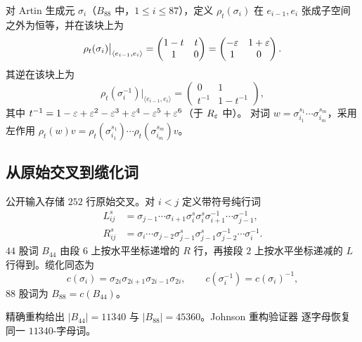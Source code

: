 \begin{definition}\label{def:burau}
对 Artin 生成元 $\sigma_i$（$B_{88}$ 中，$1\le i\le87$），定义
$\rho_t(\sigma_i)$ 在 $e_{i-1},e_i$ 张成子空间之外为恒等，并在该块上为
\[
\rho_t(\sigma_i)\big|_{\langle e_{i-1},e_i\rangle}
=
\begin{pmatrix}1-t&t\\1&0\end{pmatrix}
=
\begin{pmatrix}-\varepsilon&1+\varepsilon\\1&0\end{pmatrix}.
\]
其逆在该块上为
\[
\rho_t(\sigma_i^{-1})\big|_{\langle e_{i-1},e_i\rangle}
=
\begin{pmatrix}0&1\\t^{-1}&1-t^{-1}\end{pmatrix},
\]
其中 $t^{-1}=1-\varepsilon+\varepsilon^2-\varepsilon^3+\varepsilon^4-\varepsilon^5+\varepsilon^6$（于 $R_\varepsilon$ 中）。
对词 $w=\sigma_{i_1}^{s_1}\cdots\sigma_{i_m}^{s_m}$，采用左作用
$\rho_t(w)v=\rho_t(\sigma_{i_1}^{s_1})\cdots
\rho_t(\sigma_{i_m}^{s_m})v$。
\end{definition}

\subsection{从原始交叉到缆化词}

公开输入存储 $252$ 行原始交叉。对 $i<j$ 定义带符号纯行词
\begin{align}
L_{ij}^{s}
 &=\sigma_{j-1}\cdots\sigma_{i+1}
   \sigma_i^{s}\sigma_i^{s}
   \sigma_{i+1}^{-1}\cdots\sigma_{j-1}^{-1},
\label{eq:L-row}\\
R_{ij}^{s}
 &=\sigma_i\cdots\sigma_{j-2}
   \sigma_{j-1}^{s}\sigma_{j-1}^{s}
   \sigma_{j-2}^{-1}\cdots\sigma_i^{-1}.
\label{eq:R-row}
\end{align}
$44$ 股词 $B_{44}$ 由段 $6$ 上按水平坐标递增的 $R$ 行，再接段 $2$ 上按水平坐标递减的
$L$ 行得到。缆化同态为
\begin{equation}\label{eq:cabling}
c(\sigma_i)=\sigma_{2i}\sigma_{2i+1}\sigma_{2i-1}\sigma_{2i},
\qquad
c(\sigma_i^{-1})=c(\sigma_i)^{-1},
\end{equation}
$88$ 股词为 $B_{88}=c(B_{44})$。

\begin{proposition}[词恒等式]\label{prop:word-identities}
精确重构给出 $|B_{44}|=11340$ 与 $|B_{88}|=45360$。Johnson 重构验证器
逐字母恢复同一 $11340$-字母词。
\end{proposition}


